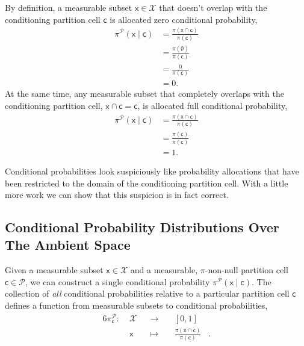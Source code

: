 \documentclass[
  letterpaper,
  DIV=11,
  numbers=noendperiod]{scrartcl}
\begin{document}
By definition, a measurable subset \(\mathsf{x} \in \mathcal{X}\) that
doesn't overlap with the conditioning partition cell \(\mathsf{c}\) is
allocated zero conditional probability, \begin{align*}
\pi^{\mathcal{P}}( \mathsf{x} \mid \mathsf{c} )
&=
\frac{ \pi(\mathsf{x} \cap \mathsf{c}) }{ \pi (\mathsf{c}) }
\\
&=
\frac{ \pi(\emptyset) }{ \pi (\mathsf{c}) }
\\
&=
\frac{ 0 }{ \pi (\mathsf{c}) }
\\
&=
0.
\end{align*} At the same time, any measurable subset that completely
overlaps with the conditioning partition cell,
\(\mathsf{x} \cap \mathsf{c} = \mathsf{c}\), is allocated full
conditional probability, \begin{align*}
\pi^{\mathcal{P}}( \mathsf{x} \mid \mathsf{c} )
&=
\frac{ \pi(\mathsf{x} \cap \mathsf{c}) }{ \pi (\mathsf{c}) }
\\
&=
\frac{ \pi(\mathsf{c}) }{ \pi (\mathsf{c}) }
\\
&=
1.
\end{align*}

Conditional probabilities look suspiciously like probability allocations
that have been restricted to the domain of the conditioning partition
cell. With a little more work we can show that this suspicion is in fact
correct.

\subsection{Conditional Probability Distributions Over The Ambient
Space}\label{conditional-probability-distributions-over-the-ambient-space}

Given a measurable subset \(\mathsf{x} \in \mathcal{X}\) and a
measurable, \(\pi\)-non-null partition cell
\(\mathsf{c} \in \mathcal{P}\), we can construct a single conditional
probability \(\pi^{\mathcal{P}}( \mathsf{x} \mid \mathsf{c})\). The
collection of \emph{all} conditional probabilities relative to a
particular partition cell \(\mathsf{c}\) defines a function from
measurable subsets to conditional probabilities, \begin{alignat*}{6}
\pi^{\mathcal{P}}_{\mathsf{c}}
:\; &\mathcal{X}& &\rightarrow& \; &[0, 1]&
\\
&\mathsf{x} & &\mapsto&
&\frac{ \pi(\mathsf{x} \cap \mathsf{c}) }{ \pi (\mathsf{c}) }&.
\end{alignat*}
\end{document}
